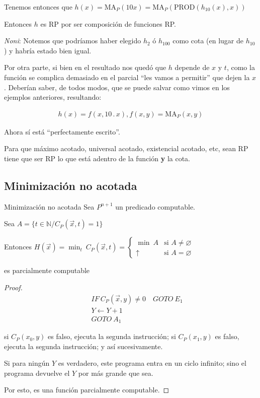 \medskip

Tenemos entonces que $h(x) = \mathrm{MA}_P (10 x)
= \mathrm{MA}_P (\mathrm{PROD}(h_{10}(x), x))$


Entonces $h$ es RP por ser composición de funciones RP.

\textit{Noni}: Notemos que podríamos haber elegido $h_2$ ó $h_{100}$ como cota (en lugar
de $h_{10}$) y habría estado bien igual.

Por otra parte, si bien en el resultado nos quedó que $h$ depende de $x$ y $t$,
como la función se complica demasiado en el parcial ``les vamos a permitir''
que dejen la $x$. Deberían saber, de todos modos, que se puede salvar como
vimos en los ejemplos anteriores, resultando:

\begin{gather*}
    h(x) = f(x,10 \, . \, x), f(x,y) = \mathrm{MA}_P(x,y)
\end{gather*}

Ahora sí está ``perfectamente escrito''.

Para que máximo acotado, universal acotado, existencial acotado, etc, sean RP
tiene que ser RP lo que está adentro de la función \textbf{y} la cota.


\subsection{Minimización no acotada}

\begin{teorema}{Minimización no acotada}{}
    Sea $P^{n+1}$ un predicado computable.

    Sea $A = \{ t \in \mathbb{N}/ C_P(\overrightarrow{x},t)=1 \}$

    \medskip

    Entonces $H(\vec{x}) = \min_{t}{~ C_P(\overrightarrow{x},t)} = 
    \begin{cases}
        \min{~ A} & \text{si } A \neq \varnothing \\
        \uparrow & \text{si } A = \varnothing
    \end{cases}$

    es parcialmente computable
\end{teorema}

\begin{proof} \phantom{.}

    \begin{align*}
        [A_1] \quad &IF ~ C_P(\overrightarrow{x},y) \neq 0 \quad GOTO ~ E_1\\
                    &Y \gets Y + 1 \\
                    &GOTO ~ A_1
    \end{align*} 

    si $C_P(x_0, y)$ es falso, ejecuta la segunda instrucción; 
    si $C_P(x_1, y)$ es falso, ejecuta la segunda instrucción;
    y así sucesivamente.

   Si para ningún $Y$ es verdadero, este programa entra en un ciclo infinito; 
   sino el programa devuelve el $Y$ por más grande que sea.

   Por esto, es una función parcialmente computable.
\end{proof}
